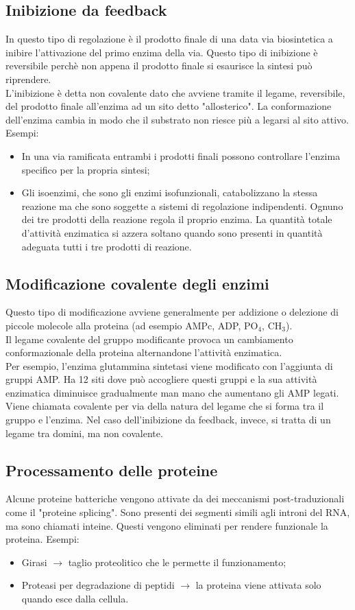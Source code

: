 \subsection{Inibizione da feedback}
In questo tipo di regolazione è il prodotto finale di una data via biosintetica a inibire l'attivazione del primo enzima della via. Questo tipo di inibizione è reversibile perchè non appena il prodotto finale si esaurisce la sintesi può riprendere. 
\\L'inibizione è detta non covalente dato che avviene tramite il legame, reversibile, del prodotto finale all'enzima ad un sito detto "allosterico". La conformazione dell'enzima cambia in modo che il substrato non riesce più a legarsi al sito attivo. 
\\Esempi:
\begin{itemize}
    \item In una via ramificata entrambi i prodotti finali possono controllare l'enzima specifico per la propria sintesi; 
    \item Gli isoenzimi, che sono gli enzimi isofunzionali, catabolizzano la stessa reazione ma che sono soggette a sistemi di regolazione indipendenti. Ognuno dei tre prodotti della reazione regola il proprio enzima. La quantità totale d'attività enzimatica si azzera soltano quando sono presenti in quantità adeguata tutti i tre prodotti di reazione.
\end{itemize}
\subsection{Modificazione covalente degli enzimi}
Questo tipo di modificazione avviene generalmente per addizione o delezione di piccole molecole alla proteina (ad esempio AMPc, ADP, PO$_4$, CH$_3$).
\\Il legame covalente del gruppo modificante provoca un cambiamento conformazionale della proteina alternandone l'attività enzimatica. 
\\Per esempio, l'enzima glutammina sintetasi viene modificato con l'aggiunta di gruppi AMP. Ha 12 siti dove può accogliere questi gruppi e la sua attività enzimatica diminuisce gradualmente man mano che aumentano gli AMP legati. 
\\Viene chiamata covalente per via della natura del legame che si forma tra il gruppo e l'enzima. Nel caso dell'inibizione da feedback, invece, si tratta di un legame tra domini, ma non covalente.
\subsection{Processamento delle proteine}
Alcune proteine batteriche vengono attivate da dei meccanismi post-traduzionali come il "proteine splicing". Sono presenti dei segmenti simili agli introni del RNA, ma sono chiamati inteine. Questi vengono eliminati per rendere funzionale la proteina. Esempi:
\begin{itemize}
    \item Girasi $\xrightarrow{}$ taglio proteolitico che le permette il funzionamento; 
    \item Proteasi per degradazione di peptidi $\xrightarrow{}$ la proteina viene attivata solo quando esce dalla cellula.
\end{itemize}
